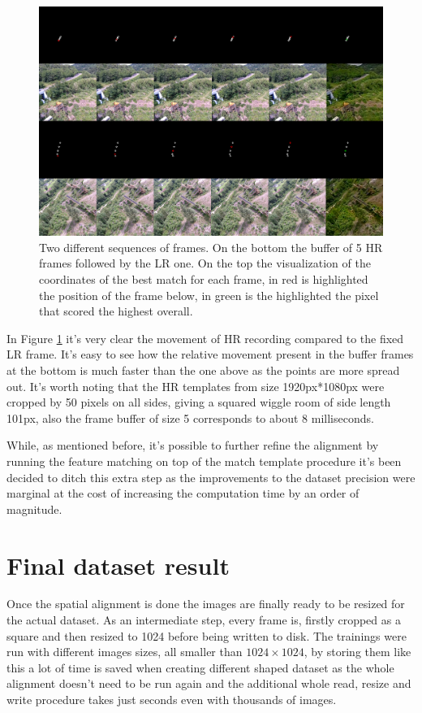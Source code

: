 \begin{figure}[H]
  \centering
  \includegraphics[scale=1.4]{figures/matchtemplate.png}
  \caption{Two different sequences of frames. On the bottom the buffer of 5 HR frames followed by the LR one. On the top the visualization of the coordinates of the best match for each frame, in red is highlighted the position of the frame below, in green is the highlighted the pixel that scored the highest overall.}
  \label{img:matchtempl}
\end{figure}

In Figure \ref{img:matchtempl} it's very clear the movement of HR recording compared to the fixed LR frame. It's easy to see how the relative movement present in the buffer frames at the bottom is much faster than the one above as the points are more spread out. It's worth noting that the HR templates from size 1920px*1080px were cropped by 50 pixels on all sides, giving a squared wiggle room of side length 101px, also the frame buffer of size 5 corresponds to about 8 milliseconds.

While, as mentioned before, it's possible to further refine the alignment by running the feature matching on top of the match template procedure it's been decided to ditch this extra step as the improvements to the dataset precision were marginal at the cost of increasing the computation time by an order of magnitude.

\section{Final dataset result}
\label{sec:final_dataset}

Once the spatial alignment is done the images are finally ready to be resized for the actual dataset. As an intermediate step, every frame is, firstly cropped as a square and then resized to 1024 before being written to disk. The trainings were run with different images sizes, all smaller than  \(1024\times1024\), by storing them like this a lot of time is saved when creating different shaped dataset as the whole alignment doesn't need to be run again and the additional whole read, resize and write procedure takes just seconds even with thousands of images.


